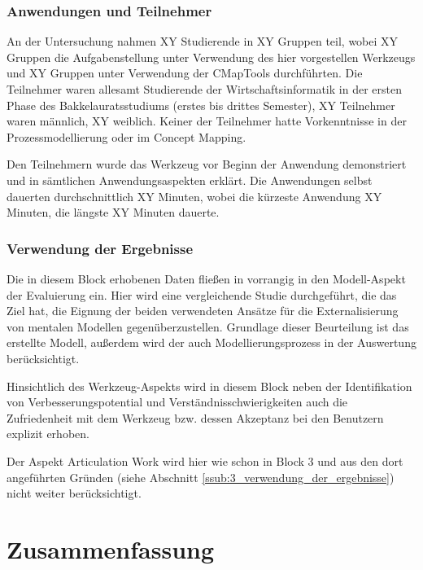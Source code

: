 
\subsubsection{Anwendungen und Teilnehmer} %
\label{ssub:5_teilnehmer}

An der Untersuchung nahmen XY Studierende in XY Gruppen teil, wobei XY Gruppen die Aufgabenstellung unter Verwendung des hier vorgestellen Werkzeugs und XY Gruppen unter Verwendung der CMapTools durchführten. Die Teilnehmer waren allesamt Studierende der Wirtschaftsinformatik in der ersten Phase des Bakkelauratsstudiums (erstes bis drittes Semester), XY Teilnehmer waren männlich, XY weiblich. Keiner der Teilnehmer hatte Vorkenntnisse in der Prozessmodellierung oder im Concept Mapping.

Den Teilnehmern wurde das Werkzeug vor Beginn der Anwendung demonstriert und in sämtlichen Anwendungsaspekten erklärt. Die Anwendungen selbst dauerten durchschnittlich XY Minuten, wobei die kürzeste Anwendung XY Minuten, die längste XY Minuten dauerte.


\subsubsection{Verwendung der Ergebnisse} %
\label{ssub:5_verwendung_der_ergebnisse}

Die in diesem Block erhobenen Daten fließen in vorrangig in den Modell-Aspekt der Evaluierung ein. Hier wird eine vergleichende Studie durchgeführt, die das Ziel hat, die Eignung der beiden verwendeten Ansätze für die Externalisierung von mentalen Modellen gegenüberzustellen. Grundlage dieser Beurteilung ist das erstellte Modell, außerdem wird der auch Modellierungsprozess in der Auswertung berücksichtigt.

Hinsichtlich des Werkzeug-Aspekts wird in diesem Block neben der Identifikation von Verbesserungspotential und Verständnisschwierigkeiten auch die Zufriedenheit mit dem Werkzeug bzw. dessen Akzeptanz bei den Benutzern explizit erhoben. 

Der Aspekt Articulation Work wird hier wie schon in Block 3 und aus den dort angeführten Gründen (siehe Abschnitt \ref{ssub:3_verwendung_der_ergebnisse}) nicht weiter berücksichtigt.


\section{Zusammenfassung}
\label{sec:eval_ueberblick_zusammenfassung}

